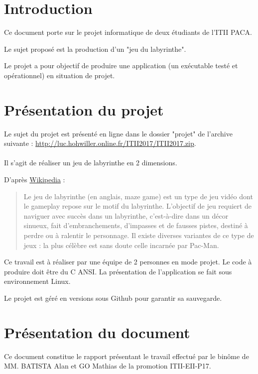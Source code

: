 \documentclass{book}
\begin{document}
\section{Introduction}

Ce document porte sur le projet informatique de deux étudiants de l’ITII PACA.

Le sujet proposé est la production d’un "jeu du labyrinthe".

Le projet a pour objectif de produire une application (un exécutable testé et
opérationnel) en situation de projet.

\section{Présentation  du projet}

Le sujet du projet est présenté en ligne dans le dossier "projet" de l'archive
suivante : \url{http://luc.hohwiller.online.fr/ITII2017/ITII2017.zip}.

\paragraph{}Il s’agit de réaliser un jeu de labyrinthe en 2 dimensions.

D’après \href{https://fr.wikipedia.org/wiki/Jeu_de_labyrinthe}{Wikipedia} :
\begin{quotation}
Le jeu de labyrinthe (en anglais, maze game) est un type de jeu vidéo dont le gameplay repose sur le motif du labyrinthe. L’objectif de jeu requiert de naviguer avec succès dans un labyrinthe, c’est-à-dire dans un décor sinueux, fait d’embranchements, d’impasses et de fausses pistes, destiné à perdre ou à ralentir le personnage. Il existe diverses variantes de ce type de jeux : la plus célèbre est sans doute celle incarnée par Pac-Man.
\end{quotation}
Ce travail est à réaliser par une équipe de 2 personnes en mode projet. Le code
à produire doit être du C ANSI. La présentation de l’application se fait sous
environnement Linux.

Le projet est géré en versions sous Github pour garantir sa sauvegarde.

\section{Présentation du document}

Ce document constitue le rapport présentant le travail effectué par le binôme de
MM. BATISTA Alan et GO Mathias de la promotion ITII-EII-P17.
\end{document}
